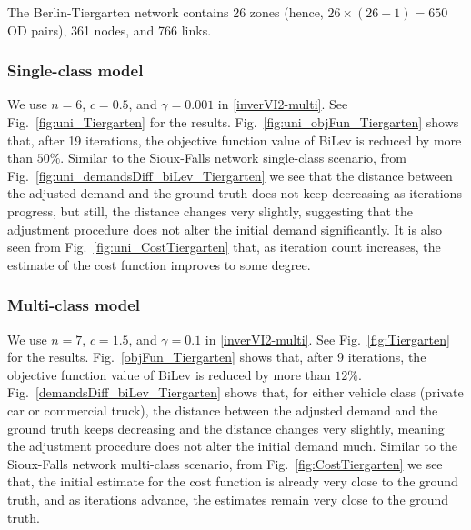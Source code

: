 \documentclass[3p]{elsarticle}
\begin{document}
The Berlin-Tiergarten network \cite{BarGera16} contains 26 zones (hence,
$26 \times (26 - 1) = 650$ OD pairs), 361 nodes, and 766 links.

\subsubsection*{Single-class model}
 We use $n=6$, $c = 0.5$, and $\gamma = 0.001$ in \eqref{inverVI2-multi}.
See Fig.~\ref{fig:uni_Tiergarten} for the
results. Fig.~\ref{fig:uni_objFun_Tiergarten} shows that, after 19
iterations, the objective function value of BiLev is reduced by more
than $50\%$. Similar to the Sioux-Falls network single-class scenario,
from Fig.~\ref{fig:uni_demandsDiff_biLev_Tiergarten} we see that the
distance between the adjusted demand and the ground truth does not keep
decreasing as iterations progress, but still, the distance changes very
slightly, suggesting that the adjustment procedure does not alter the
initial demand significantly. It is also seen from
Fig.~\ref{fig:uni_CostTiergarten} that, as iteration count increases,
the estimate of the cost function improves to some degree.  


\subsubsection*{Multi-class model}
We use $n=7$, $c = 1.5$, and $\gamma = 0.1$ in \eqref{inverVI2-multi}.
See Fig.~\ref{fig:Tiergarten} for the
results. Fig.~\ref{objFun_Tiergarten} shows that, after 9 iterations,
the objective function value of BiLev is reduced by more than
$12\%$. Fig.~\ref{demandsDiff_biLev_Tiergarten} shows that, for either
vehicle class (private car or commercial truck), the distance between
the adjusted demand and the ground truth keeps decreasing and the
distance changes very slightly, meaning the adjustment procedure does
not alter the initial demand much. Similar to the Sioux-Falls network
multi-class scenario, from Fig.~\ref{fig:CostTiergarten} we see that,
the initial estimate for the cost function is already very close to the
ground truth, and as iterations advance, the estimates remain very close
to the ground truth. 
\end{document}
